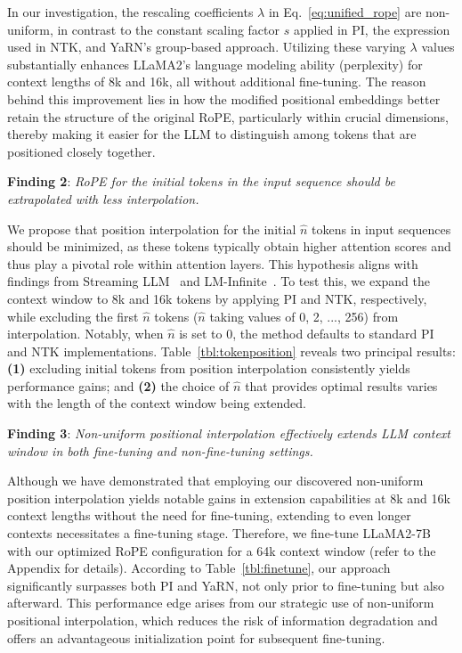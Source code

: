 In our investigation, the rescaling coefficients $\lambda$ in Eq.~\ref{eq:unified_rope} are non-uniform, in contrast to the constant scaling factor $s$ applied in PI, the expression used in NTK, and YaRN's group-based approach. Utilizing these varying $\lambda$ values substantially enhances LLaMA2's language modeling ability (perplexity) for context lengths of 8k and 16k, all without additional fine-tuning. The reason behind this improvement lies in how the modified positional embeddings better retain the structure of the original RoPE, particularly within crucial dimensions, thereby making it easier for the LLM to distinguish among tokens that are positioned closely together.

\textbf{Finding 2}: \textit{RoPE for the initial tokens in the input sequence should be extrapolated with less interpolation.} 

We propose that position interpolation for the initial $\hat{n}$ tokens in input sequences should be minimized, as these tokens typically obtain higher attention scores and thus play a pivotal role within attention layers. This hypothesis aligns with findings from Streaming LLM~\cite{streamingllm} and LM-Infinite~\cite{han2023lminfinite}. To test this, we expand the context window to 8k and 16k tokens by applying PI and NTK, respectively, while excluding the first $\hat n$ tokens ($\hat n$ taking values of 0, 2, ..., 256) from interpolation. Notably, when $\hat n$ is set to 0, the method defaults to standard PI and NTK implementations. Table~\ref{tbl:tokenposition} reveals two principal results: \textbf{(1)} excluding initial tokens from position interpolation consistently yields performance gains; and \textbf{(2)} the choice of $\hat n$ that provides optimal results varies with the length of the context window being extended.

\textbf{Finding 3}: \textit{Non-uniform positional interpolation effectively extends LLM context window in both fine-tuning and non-fine-tuning settings.} 

Although we have demonstrated that employing our discovered non-uniform position interpolation yields notable gains in extension capabilities at 8k and 16k context lengths without the need for fine-tuning, extending to even longer contexts necessitates a fine-tuning stage. Therefore, we fine-tune LLaMA2-7B with our optimized RoPE configuration for a 64k context window (refer to the Appendix for details). According to Table~\ref{tbl:finetune}, our approach significantly surpasses both PI and YaRN, not only prior to fine-tuning but also afterward. This performance edge arises from our strategic use of non-uniform positional interpolation, which reduces the risk of information degradation and offers an advantageous initialization point for subsequent fine-tuning.

